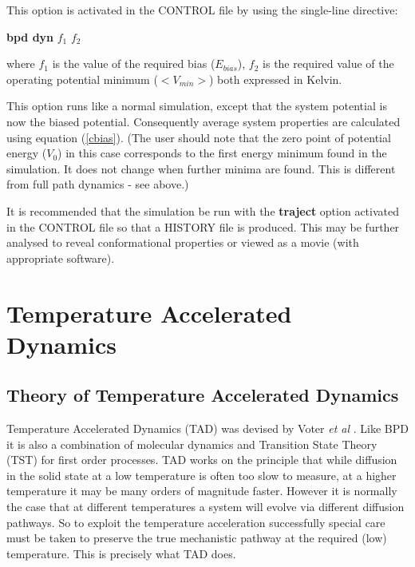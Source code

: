 \noindent This option is activated in the CONTROL file by using the 
single-line directive:

{\bf bpd dyn} $f_1$ $f_2$

\noindent where $f_1$ is the value of the required bias ($E_{bias}$), 
$f_2$ is the required value of the operating potential minimum
($<V_{min}>$) both expressed in Kelvin.

This option runs like a normal \D{} simulation, except that the
system potential is now the biased potential. Consequently average
system properties are calculated using equation (\ref{cbias}). (The user
should note that the zero point of potential energy ($V_{0}$) in this case
corresponds to the first energy minimum found in the simulation. It does not
change when further minima are found. This is different from full path
dynamics - see above.)

It is recommended that the simulation be run with the {\bf traject}
option activated in the CONTROL file so that a HISTORY file is
produced. This may be further analysed to reveal conformational
properties or viewed as a movie (with appropriate software).

\section{Temperature Accelerated Dynamics}
\label{TAD}
\subsection{Theory of Temperature Accelerated Dynamics}

Temperature Accelerated Dynamics (TAD) was devised by Voter {\em et al}
\cite{voter-00a}. Like BPD it is also a combination of molecular
dynamics and Transition State Theory (TST) for first order processes.
TAD works on the principle that while diffusion in the solid state at
a low temperature is often too slow to measure, at a higher
temperature it may be many orders of magnitude faster. However it is
normally the case that at different temperatures a system will
evolve via different diffusion pathways. So to exploit the
temperature acceleration successfully special care must be taken to
preserve the true mechanistic pathway at the required (low)
temperature. This is precisely what TAD does.

